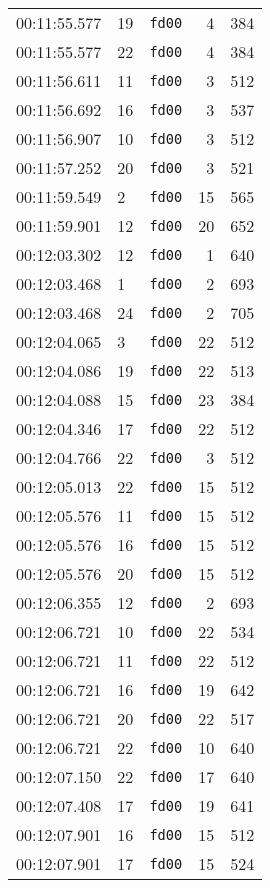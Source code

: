 \documentclass{article}
\begin{document}
\begin{longtable}{lllrr}
00:11:55.577 & 19 & \texttt{fd00} & 4 & 384 \\
00:11:55.577 & 22 & \texttt{fd00} & 4 & 384 \\
00:11:56.611 & 11 & \texttt{fd00} & 3 & 512 \\
00:11:56.692 & 16 & \texttt{fd00} & 3 & 537 \\
00:11:56.907 & 10 & \texttt{fd00} & 3 & 512 \\
00:11:57.252 & 20 & \texttt{fd00} & 3 & 521 \\
00:11:59.549 & 2 & \texttt{fd00} & 15 & 565 \\
00:11:59.901 & 12 & \texttt{fd00} & 20 & 652 \\
00:12:03.302 & 12 & \texttt{fd00} & 1 & 640 \\
00:12:03.468 & 1 & \texttt{fd00} & 2 & 693 \\
00:12:03.468 & 24 & \texttt{fd00} & 2 & 705 \\
00:12:04.065 & 3 & \texttt{fd00} & 22 & 512 \\
00:12:04.086 & 19 & \texttt{fd00} & 22 & 513 \\
00:12:04.088 & 15 & \texttt{fd00} & 23 & 384 \\
00:12:04.346 & 17 & \texttt{fd00} & 22 & 512 \\
00:12:04.766 & 22 & \texttt{fd00} & 3 & 512 \\
00:12:05.013 & 22 & \texttt{fd00} & 15 & 512 \\
00:12:05.576 & 11 & \texttt{fd00} & 15 & 512 \\
00:12:05.576 & 16 & \texttt{fd00} & 15 & 512 \\
00:12:05.576 & 20 & \texttt{fd00} & 15 & 512 \\
00:12:06.355 & 12 & \texttt{fd00} & 2 & 693 \\
00:12:06.721 & 10 & \texttt{fd00} & 22 & 534 \\
00:12:06.721 & 11 & \texttt{fd00} & 22 & 512 \\
00:12:06.721 & 16 & \texttt{fd00} & 19 & 642 \\
00:12:06.721 & 20 & \texttt{fd00} & 22 & 517 \\
00:12:06.721 & 22 & \texttt{fd00} & 10 & 640 \\
00:12:07.150 & 22 & \texttt{fd00} & 17 & 640 \\
00:12:07.408 & 17 & \texttt{fd00} & 19 & 641 \\
00:12:07.901 & 16 & \texttt{fd00} & 15 & 512 \\
00:12:07.901 & 17 & \texttt{fd00} & 15 & 524 \\

\end{longtable}
\end{document}
